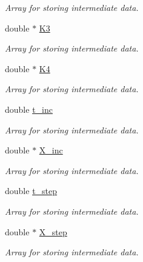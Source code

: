 \begin{DoxyCompactItemize}
\begin{DoxyCompactList}\small\item\em Array for storing intermediate data. \end{DoxyCompactList}\item 
\hypertarget{structrk4_aa0a71aaaedac1ab7b3e03be4604e1845}{double $\ast$ \hyperlink{structrk4_aa0a71aaaedac1ab7b3e03be4604e1845}{K3}}\label{structrk4_aa0a71aaaedac1ab7b3e03be4604e1845}

\begin{DoxyCompactList}\small\item\em Array for storing intermediate data. \end{DoxyCompactList}\item 
\hypertarget{structrk4_af94017f53b4c629e055a14f8c48572dd}{double $\ast$ \hyperlink{structrk4_af94017f53b4c629e055a14f8c48572dd}{K4}}\label{structrk4_af94017f53b4c629e055a14f8c48572dd}

\begin{DoxyCompactList}\small\item\em Array for storing intermediate data. \end{DoxyCompactList}\item 
\hypertarget{structrk4_ab4c880c62f39a795976c2b0746accfa0}{double \hyperlink{structrk4_ab4c880c62f39a795976c2b0746accfa0}{t\-\_\-inc}}\label{structrk4_ab4c880c62f39a795976c2b0746accfa0}

\begin{DoxyCompactList}\small\item\em Array for storing intermediate data. \end{DoxyCompactList}\item 
\hypertarget{structrk4_add018b35c5fce3c60568f5f417247fba}{double $\ast$ \hyperlink{structrk4_add018b35c5fce3c60568f5f417247fba}{X\-\_\-inc}}\label{structrk4_add018b35c5fce3c60568f5f417247fba}

\begin{DoxyCompactList}\small\item\em Array for storing intermediate data. \end{DoxyCompactList}\item 
\hypertarget{structrk4_a1cd740ec71a9b29db5f7e66977e3f141}{double \hyperlink{structrk4_a1cd740ec71a9b29db5f7e66977e3f141}{t\-\_\-step}}\label{structrk4_a1cd740ec71a9b29db5f7e66977e3f141}

\begin{DoxyCompactList}\small\item\em Array for storing intermediate data. \end{DoxyCompactList}\item 
\hypertarget{structrk4_aad92411111f3087775236a631b4ede78}{double $\ast$ \hyperlink{structrk4_aad92411111f3087775236a631b4ede78}{X\-\_\-step}}\label{structrk4_aad92411111f3087775236a631b4ede78}

\begin{DoxyCompactList}\small\item\em Array for storing intermediate data. \end{DoxyCompactList}\end{DoxyCompactItemize}


